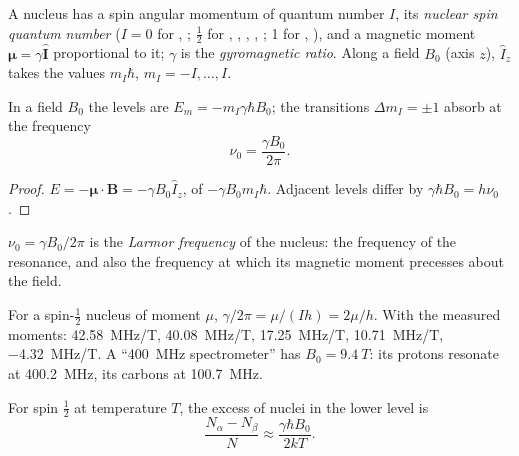 \begin{definition}\label{def:b3:advanced-nmr:nuclear-spin}
A nucleus has a spin angular momentum of quantum number $I$, its
\emph{nuclear spin quantum number} ($I = 0$
for , ; $\frac12$ for , , , ,
; 1 for , ), and a magnetic moment $\boldsymbol\mu = \gamma\hat{\mathbf
I}$ proportional to it; $\gamma$ is the \emph{gyromagnetic ratio}.
Along a field $B_0$ (axis $z$), $\hat I_z$ takes the values $m_I\hbar$,
$m_I = -I, \dots, I$.
\end{definition}

\begin{proposition}\label{prop:b3:advanced-nmr:zeeman}
In a field $B_0$ the levels are $E_m = -m_I\gamma\hbar B_0$; the transitions $\Delta m_I = \pm1$
absorb at the frequency
\[
\nu_0 = \frac{\gamma B_0}{2\pi}.
\]
\end{proposition}

\begin{proof}
$E = -\boldsymbol\mu\cdot\mathbf B = -\gamma B_0\hat I_z$, of  $-\gamma B_0m_I\hbar$. Adjacent
levels differ by $\gamma\hbar B_0 = h\nu_0$.
\end{proof}

\begin{definition}\label{def:b3:advanced-nmr:larmor}
$\nu_0 = \gamma B_0/2\pi$ is the \emph{Larmor frequency} of the
nucleus: the frequency of the resonance, and also the frequency at which its
magnetic moment precesses about the field.
\end{definition}

\begin{example}\label{ex:b3:advanced-nmr:nuclei}
For a spin-$\frac12$ nucleus of moment $\mu$, $\gamma/2\pi = \mu/(Ih) = 2\mu/h$. With the
measured moments:  \qty{42.58}{MHz/T},  \qty{40.08}{MHz/T}, 
\qty{17.25}{MHz/T},  \qty{10.71}{MHz/T},  \qty{-4.32}{MHz/T}. A
``\qty{400}{MHz} spectrometer'' has $B_0 = \qty{9.4}{T}$: its protons resonate at
\qty{400.2}{MHz}, its carbons at \qty{100.7}{MHz}.
\end{example}

\begin{proposition}\label{prop:b3:advanced-nmr:populations}
For spin $\frac12$ at temperature $T$, the excess of nuclei in the lower level is
\[
\frac{N_\alpha - N_\beta}{N} \approx \frac{\gamma\hbar B_0}{2kT}.
\]
\end{proposition}

